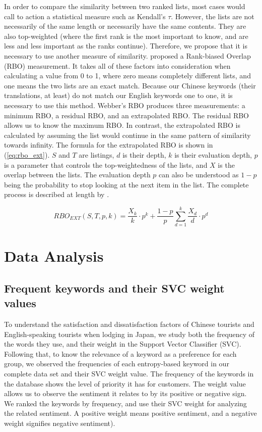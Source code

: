 \documentclass[smallextended,natbib]{svjour3}       %
\begin{document}
    In order to compare the similarity between two ranked lists, most cases would call to action a statistical measure such as Kendall's \(\tau\). However, the lists are not necessarily of the same length or necessarily have the same contents. They are also top-weighted (where the first rank is the most important to know, and are less and less important as the ranks continue). Therefore, we propose that it is necessary to use another measure of similarity. \cite{webber2010similarity} proposed a Rank-biased Overlap (RBO) measurement. It takes all of these factors into consideration when calculating a value from 0 to 1, where zero means completely different lists, and one means the two lists are an exact match. Because our Chinese keywords (their translations, at least) do not match our English keywords one to one, it is necessary to use this method. Webber's RBO produces three measurements: a minimum RBO, a residual RBO, and an extrapolated RBO.
    The residual RBO allows us to know the maximum RBO. In contrast, the extrapolated RBO is calculated by assuming the list would continue in the same pattern of similarity towards infinity. The formula for the extrapolated RBO is shown in (\ref{eq:rbo_ext}). \(S\) and \(T\) are listings, \(d\) is their depth, \(k\) is their evaluation depth, \(p\) is a parameter that controls the top-weightedness of the lists, and \(X\) is the overlap between the lists. The evaluation depth \(p\) can also be understood as \(1-p\) being the probability to stop looking at the next item in the list. The complete process is described at length by \cite{webber2010similarity}.

    \begin{equation}\label{eq:rbo_ext}
    RBO_{EXT}(S,T,p,k) = \frac{X_k}{k} \cdot p^k + \frac{1-p}{p} \sum_{d=1}^k{\frac{X_d}{d} \cdot p^d}
    \end{equation}

\section{Data Analysis}\label{dataanalysis}

  \subsection{Frequent keywords and their SVC weight values}\label{svmresults}

    To understand the satisfaction and dissatisfaction factors of Chinese tourists and English-speaking tourists when lodging in Japan, we study both the frequency of the words they use, and their weight in the Support Vector Classifier (SVC). Following that, to know the relevance of a keyword as a preference for each group, we observed the frequencies of each entropy-based keyword in our complete data set and their SVC weight value. The frequency of the keywords in the database shows the level of priority it has for customers. The weight value allows us to observe the sentiment it relates to by its positive or negative sign. We ranked the keywords by frequency, and use their SVC weight for analyzing the related sentiment. A positive weight means positive sentiment, and a negative weight signifies negative sentiment). 
\end{document}

